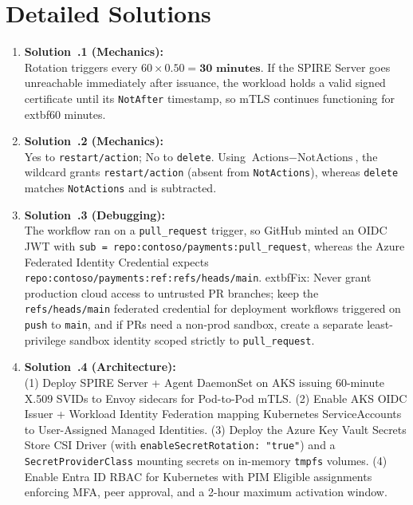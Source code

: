 \section{Detailed Solutions}
\begin{enumerate}[leftmargin=18pt]
  \item \textbf{Solution~\thechapter.1 (Mechanics):}\\
  Rotation triggers every $60 \times 0.50 = \mathbf{30\text{ minutes}}$. If the SPIRE Server goes unreachable immediately after issuance, the workload holds a valid signed certificate until its \texttt{NotAfter} timestamp, so mTLS continues functioning for 	extbf{60 minutes}.

  \item \textbf{Solution~\thechapter.2 (Mechanics):}\\
  Yes to \texttt{restart/action}; No to \texttt{delete}. Using $\text{Actions} - \text{NotActions}$, the wildcard grants \texttt{restart/action} (absent from \texttt{NotActions}), whereas \texttt{delete} matches \texttt{NotActions} and is subtracted.

  \item \textbf{Solution~\thechapter.3 (Debugging):}\\
  The workflow ran on a \texttt{pull\_request} trigger, so GitHub minted an OIDC JWT with \texttt{sub = repo:contoso/payments:pull\_request}, whereas the Azure Federated Identity Credential expects \texttt{repo:contoso/payments:ref:refs/heads/main}. 	extbf{Fix:} Never grant production cloud access to untrusted PR branches; keep the \texttt{refs/heads/main} federated credential for deployment workflows triggered on \texttt{push} to \texttt{main}, and if PRs need a non-prod sandbox, create a separate least-privilege sandbox identity scoped strictly to \texttt{pull\_request}.

  \item \textbf{Solution~\thechapter.4 (Architecture):}\\
  (1) Deploy SPIRE Server + Agent DaemonSet on AKS issuing 60-minute X.509 SVIDs to Envoy sidecars for Pod-to-Pod mTLS. (2) Enable AKS OIDC Issuer + Workload Identity Federation mapping Kubernetes ServiceAccounts to User-Assigned Managed Identities. (3) Deploy the Azure Key Vault Secrets Store CSI Driver (with \texttt{enableSecretRotation: "true"}) and a \texttt{SecretProviderClass} mounting secrets on in-memory \texttt{tmpfs} volumes. (4) Enable Entra ID RBAC for Kubernetes with PIM Eligible assignments enforcing MFA, peer approval, and a 2-hour maximum activation window.


\end{enumerate}
